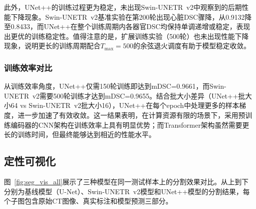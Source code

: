 \documentclass[12pt, a4paper]{article}
\begin{document}
此外，UNet++的训练过程更为稳定，未出现Swin-UNETR~v2中观察到的后期性能下降现象。Swin-UNETR~v2基准实验在第200轮出现心脏DSC骤降，从0.9132降至0.8433，而UNet++在整个训练周期内各器官DSC均保持单调递增或稳定，表现出更优的训练稳定性。值得注意的是，扩展训练实验（500轮）也未出现性能下降现象，说明更长的训练周期配合$T_{\max}=500$的余弦退火调度有助于模型稳定收敛。

\subsubsection{训练效率对比}

从训练效率角度，UNet++仅需150轮训练即达到mDSC=0.9661，而Swin-UNETR~v2需要500轮训练才达到mDSC=0.9655。结合批大小差异（UNet++批大小64 vs Swin-UNETR~v2批大小16），UNet++在每个epoch中处理更多的样本梯度，进一步加速了有效收敛。这一结果表明，在计算资源有限的场景下，采用预训练编码器的CNN架构在训练效率上具有明显优势；而Transformer架构虽然需要更长的训练时间，但最终能够达到相近的性能水平。

\subsection{定性可视化}
\label{sec:qualitative}

图~\ref{fig:seg_vis_all}展示了三种模型在同一测试样本上的分割效果对比。从上到下分别为基线模型（U-Net）、Swin-UNETR~v2模型和UNet++模型的分割结果，每个子图包含原始CT图像、真实标注和模型预测三部分。
\end{document}
